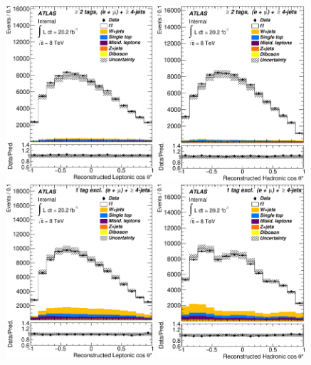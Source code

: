\begin{figure}[!hb]
  \begin{center}
    \includegraphics[height=65mm]{chapters/whel/figures/control_Plots2/elmu_2incl_LH48/CosTheta_reco_lep_elmu}
    \includegraphics[height=65mm]{chapters/whel/figures/control_Plots2/elmu_2incl_LH48/CosTheta_reco_had_elmu}\\
    \includegraphics[height=65mm]{chapters/whel/figures/control_Plots2/elmu_1excl_LH48/CosTheta_reco_lep_elmu}
    \includegraphics[height=65mm]{chapters/whel/figures/control_Plots2/elmu_1excl_LH48/CosTheta_reco_had_elmu}

\end{center}
\end{figure}
